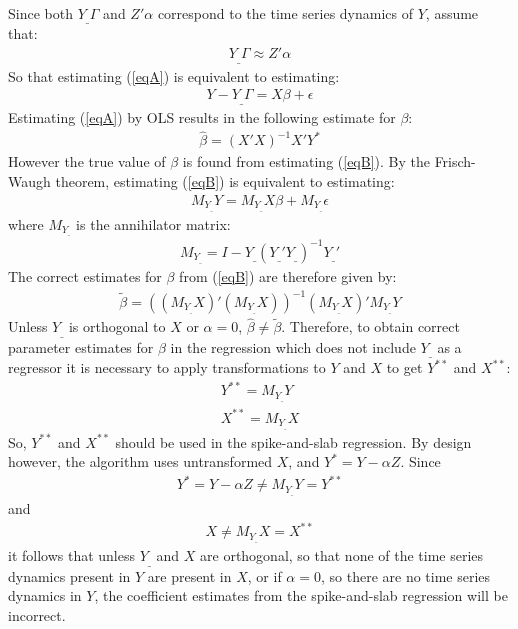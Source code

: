Since both $Y_{\_}\Gamma$ and $Z'\alpha $ correspond to the time series dynamics of $Y$, assume that:
\begin{align}
Y_{\_}\Gamma \approx Z'\alpha 
\end{align}
So that estimating (\ref{eqA}) is equivalent to estimating:
\begin{align}
Y - Y_{\_}\Gamma =  X\beta + \epsilon \label{eqC}
\end{align}
Estimating (\ref{eqA}) by OLS results in the following estimate for $\beta$:
\begin{align}
\widehat{\beta} = (X'X)^{-1}X'Y^*
\end{align}
However the true value of $\beta$ is found from estimating (\ref{eqB}). By the Frisch-Waugh theorem, estimating (\ref{eqB}) is equivalent to estimating:
\begin{align}
M_{Y_{\_}}Y = M_{Y_{\_}}X\beta + M_{Y_{\_}}\epsilon
\end{align}
where $M_{Y_{\_}}$ is the annihilator matrix:
\begin{align}
M_{Y_{\_}} = I - Y_{\_}(Y_{\_}'Y_{\_})^{-1}Y_{\_}'
\end{align}
The correct estimates for $\beta$ from (\ref{eqB}) are therefore given by: 
\begin{align}
\widetilde{\beta} = ((M_{Y_{\_}}X)'(M_{Y_{\_}}X))^{-1}(M_{Y_{\_}}X)'M_{Y_{\_}}Y
\end{align}
Unless $Y_{\_}$ is orthogonal to $X$ or $\alpha = 0$, $\widehat{\beta} \neq \widetilde{\beta}$. Therefore, to obtain correct parameter estimates for $\beta$ in the regression which does not include $Y_{\_}$ as a regressor it is necessary to apply transformations to $Y$ and $X$ to get $Y^{**}$ and $X^{**}$:
\begin{align}
Y^{**} = M_{Y_{\_}}Y\\
X^{**} = M_{Y_{\_}}X
\end{align}
So, $Y^{**}$ and $X^{**}$ should be used in the spike-and-slab regression. By design however, the algorithm uses untransformed $X$, and $Y^{*} = Y -  \alpha Z$. Since
\begin{align}
Y^{*} = Y -  \alpha Z \neq M_{Y_{\_}}Y = Y^{**} 
\end{align}
and
\begin{align}
X \neq M_{Y_{\_}}X = X^{**} 
\end{align}
it follows that unless $Y_{\_}$ and $X$ are orthogonal, so that none of the time series dynamics present in $Y$ are present in $X$, or if $\alpha = 0$, so there are no time series dynamics in $Y$, the coefficient estimates from the spike-and-slab regression will be incorrect. 

